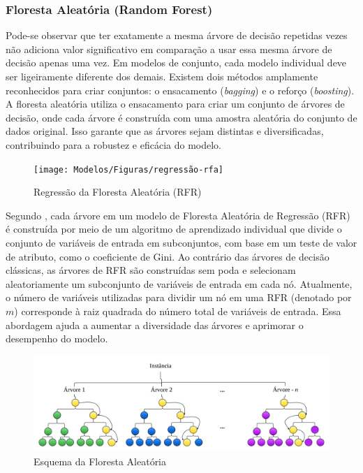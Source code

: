 \subsubsection{Floresta Aleat\'oria (Random Forest)} \label{subsubsec:rf}

Pode-se observar que ter exatamente a mesma árvore de decisão repetidas vezes não adiciona valor significativo em comparação a usar essa mesma árvore de decisão apenas uma vez. Em modelos de conjunto, cada modelo individual deve ser ligeiramente diferente dos demais. Existem dois métodos amplamente reconhecidos para criar conjuntos: o ensacamento (\textit{bagging}) e o reforço (\textit{boosting}). A floresta aleatória utiliza o ensacamento para criar um conjunto de árvores de decisão, onde cada árvore é construída com uma amostra aleatória do conjunto de dados original. Isso garante que as árvores sejam distintas e diversificadas, contribuindo para a robustez e eficácia do modelo.


\begin{figure}[!htpb]
	\centering
	\caption{Regressão da Floresta Aleatória (RFR)}
	\label{fig:1-regressao-rfa}
	\texttt{[image: Modelos/Figuras/regressão-rfa]}
	
\end{figure}


Segundo , cada árvore em um modelo de Floresta Aleatória de Regressão (RFR) é construída por meio de um algoritmo de aprendizado individual que divide o conjunto de variáveis de entrada em subconjuntos, com base em um teste de valor de atributo, como o coeficiente de Gini. Ao contrário das árvores de decisão clássicas, as árvores de RFR são construídas sem poda e selecionam aleatoriamente um subconjunto de variáveis de entrada em cada nó. Atualmente, o número de variáveis utilizadas para dividir um nó em uma RFR (denotado por $m$) corresponde à raiz quadrada do número total de variáveis de entrada. Essa abordagem ajuda a aumentar a diversidade das árvores e aprimorar o desempenho do modelo.

\begin{figure}[!htb]
	\centering
	\caption{Esquema da Floresta Aleatória}
	\label{fig:rf}
	\includegraphics[width=1\linewidth]{Modelos/Figuras/RF}
	
\end{figure}


